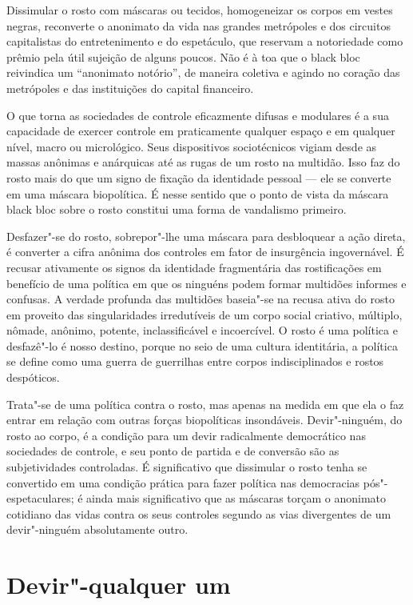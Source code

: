 Dissimular o rosto com máscaras ou tecidos, homogeneizar os corpos em
vestes negras, reconverte o anonimato da vida nas grandes metrópoles e
dos circuitos capitalistas do entretenimento e do espetáculo, que
reservam a notoriedade como prêmio pela útil sujeição de alguns poucos.
Não é à toa que o black bloc reivindica um ``anonimato
notório'', de maneira coletiva e agindo no coração das metrópoles
e das instituições do capital financeiro.

O que torna as sociedades de controle eficazmente difusas e modulares é
a sua capacidade de exercer controle em praticamente qualquer espaço e
em qualquer nível, macro ou micrológico. Seus dispositivos sociotécnicos
vigiam desde as massas anônimas e anárquicas até as rugas de um rosto na
multidão. Isso faz do rosto mais do que um signo de fixação da
identidade pessoal --- ele se converte em uma máscara biopolítica. É
nesse sentido que o ponto de vista da máscara black bloc sobre o
rosto constitui uma forma de vandalismo primeiro.

Desfazer"-se do rosto, sobrepor"-lhe uma máscara para desbloquear a ação
direta, é converter a cifra anônima dos controles em fator de
insurgência ingovernável. É recusar ativamente os signos da identidade
fragmentária das rostificações em benefício de uma política em que os
ninguéns podem formar multidões informes e confusas. A verdade profunda
das multidões baseia"-se na recusa ativa do rosto em proveito das
singularidades irredutíveis de um corpo social criativo, múltiplo,
nômade, anônimo, potente, inclassificável e incoercível. O rosto é uma
política e desfazê"-lo é nosso destino, porque no seio de uma cultura
identitária, a política se define como uma guerra de guerrilhas entre
corpos indisciplinados e rostos despóticos.

Trata"-se de uma política contra o rosto, mas apenas na medida em que ela
o faz entrar em relação com outras forças biopolíticas insondáveis.
Devir"-ninguém, do rosto ao corpo, é a condição para um devir
radicalmente democrático nas sociedades de controle, e seu ponto de
partida e de conversão são as subjetividades controladas. É
significativo que dissimular o rosto tenha se convertido em uma condição
prática para fazer política nas democracias pós"-espetaculares; é ainda
mais significativo que as máscaras torçam o anonimato cotidiano das
vidas contra os seus controles segundo as vias divergentes de um
devir"-ninguém absolutamente outro.

\section{Devir"-qualquer um}

